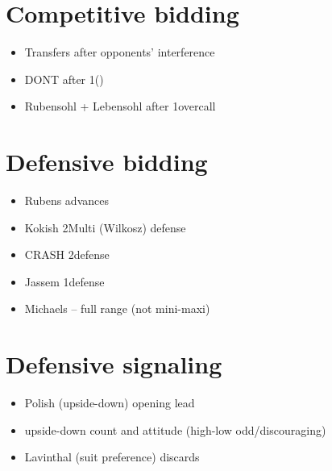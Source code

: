 \documentclass[12pt, a4paper]{report}
\begin{document}
{    \section*{\colorbox{blue!30}{Competitive bidding}}

        \begin{itemize}
            \item Transfers after opponents' interference
            \item DONT after 1\nt (\dbl)
            \item Rubensohl + Lebensohl after 1\nt overcall
        \end{itemize}

    \section*{\colorbox{blue!30}{Defensive bidding}}

        \begin{itemize}
            \item Rubens advances
            \item Kokish 2\diams Multi (Wilkosz) defense
            \item CRASH 2\nt defense
            \item Jassem 1\nt defense
            \item Michaels -- full range (not mini-maxi)
        \end{itemize}

    \section*{\colorbox{blue!30}{Defensive signaling}}

        \begin{itemize}
            \item Polish (upside-down) opening lead
            \item upside-down count and attitude (high-low odd/discouraging)
            \item Lavinthal (suit preference) discards
        \end{itemize}

}
\end{document}
